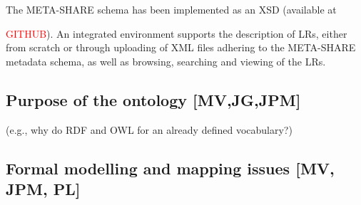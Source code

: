 \documentclass{llncs}
\begin{document}
The META-SHARE schema has been implemented as an XSD (available at {\textcolor{red}{GITHUB}). An integrated environment supports the description of LRs, either from scratch or through uploading of XML files adhering to the META-SHARE metadata schema, as well as browsing, searching and viewing of the LRs.
\subsection{Purpose of the ontology [MV,JG,JPM]}
\label{sec:purpose}
(e.g., why do RDF and OWL for an already defined vocabulary?)

\subsection{Formal modelling and mapping issues [MV, JPM, PL]}

}
\end{document}
